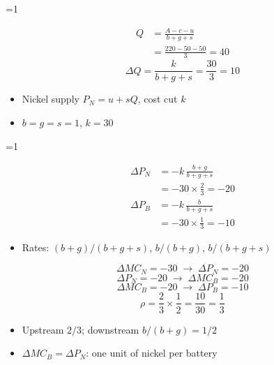 \documentclass{beamer}
\newcommand{\showanswers}{0}
\begin{document}
\ifnum\showanswers=1
\begin{frame}[plain,label=w2_ans_q32n1]
  \Large
  \begin{align*}
    \tag{M40}\;Q &= \frac{A - c - u}{b + g + s}\\
                 &= \frac{220 - 50 - 50}{3} = 40
  \end{align*}
  \[
    \tag{M41}\;\Delta Q = \frac{k}{b + g + s} = \frac{30}{3} = 10
  \]

  \vspace{0.3em}
  \begin{itemize}\Large
    \item Nickel supply $P_N = u + sQ$, cost cut $k$
    \item $b = g = s = 1$, $k = 30$
  \end{itemize}
\end{frame}
\fi

\ifnum\showanswers=1
\begin{frame}[plain,label=w2_ans_q32n2]
  \Large
  \begin{align*}
    \tag{M42}\;\Delta P_N &= -k\,\frac{b + g}{b + g + s}\\
                          &= -30 \times \frac{2}{3} = -20
  \end{align*}
  \begin{align*}
    \tag{M43}\;\Delta P_B &= -k\,\frac{b}{b + g + s}\\
                          &= -30 \times \frac{1}{3} = -10
  \end{align*}

  \vspace{0.3em}
  \begin{itemize}\Large
    \item Rates: $(b+g)/(b+g+s)$, $b/(b+g)$, $b/(b+g+s)$
  \end{itemize}
\end{frame}
\fi

\begin{frame}[plain,label=w2_wt7_chain]
  \Large
  \[
    \tag{20}\;\Delta MC_N = -30 \;\longrightarrow\; \Delta P_N = -20
  \]
  \[
    \tag{21}\;\Delta P_N = -20 \;\longrightarrow\; \Delta MC_B = -20
  \]
  \[
    \tag{22}\;\Delta MC_B = -20 \;\longrightarrow\; \Delta P_B = -10
  \]
  \[
    \tag{23}\;\rho = \frac{2}{3} \times \frac{1}{2} = \frac{10}{30} = \frac{1}{3}
  \]

  \vspace{0.3em}
  \begin{itemize}\Large
    \item Upstream $2/3$; downstream $b/(b + g) = 1/2$
    \item $\Delta MC_B = \Delta P_N$: one unit of nickel per battery
  \end{itemize}
\end{frame}
\end{document}
